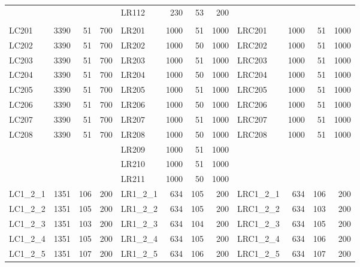 \documentclass{anpet}
\begin{document}
\begin{table}[H]
\begin{tabular}{lrrr|lrrr|lrrr}
                   &      &     &     & LR112      &  230 &  53 &  200 &             &      &     &     \\
                   &      &     &     &            &      &     &      &             &      &     &     \\
        LC201      & 3390 &  51 & 700 & LR201      & 1000 &  51 & 1000 & LRC201      & 1000 &  51 & 1000\\
        LC202      & 3390 &  51 & 700 & LR202      & 1000 &  50 & 1000 & LRC202      & 1000 &  51 & 1000\\
        LC203      & 3390 &  51 & 700 & LR203      & 1000 &  51 & 1000 & LRC203      & 1000 &  51 & 1000\\
        LC204      & 3390 &  51 & 700 & LR204      & 1000 &  50 & 1000 & LRC204      & 1000 &  51 & 1000\\
        LC205      & 3390 &  51 & 700 & LR205      & 1000 &  51 & 1000 & LRC205      & 1000 &  51 & 1000\\
        LC206      & 3390 &  51 & 700 & LR206      & 1000 &  50 & 1000 & LRC206      & 1000 &  51 & 1000\\
        LC207      & 3390 &  51 & 700 & LR207      & 1000 &  51 & 1000 & LRC207      & 1000 &  51 & 1000\\
        LC208      & 3390 &  51 & 700 & LR208      & 1000 &  50 & 1000 & LRC208      & 1000 &  51 & 1000\\
                   &      &     &     & LR209      & 1000 &  51 & 1000 &             &      &     &     \\
                   &      &     &     & LR210      & 1000 &  51 & 1000 &             &      &     &     \\
                   &      &     &     & LR211      & 1000 &  50 & 1000 &             &      &     &     \\
        \midrule
        LC1\_2\_1  & 1351 & 106 & 200 & LR1\_2\_1  &  634 & 105 &  200 & LRC1\_2\_1  &  634 & 106 &  200\\
        LC1\_2\_2  & 1351 & 105 & 200 & LR1\_2\_2  &  634 & 105 &  200 & LRC1\_2\_2  &  634 & 103 &  200\\
        LC1\_2\_3  & 1351 & 103 & 200 & LR1\_2\_3  &  634 & 104 &  200 & LRC1\_2\_3  &  634 & 105 &  200\\
        LC1\_2\_4  & 1351 & 105 & 200 & LR1\_2\_4  &  634 & 105 &  200 & LRC1\_2\_4  &  634 & 106 &  200\\
        LC1\_2\_5  & 1351 & 107 & 200 & LR1\_2\_5  &  634 & 106 &  200 & LRC1\_2\_5  &  634 & 107 &  200\\

\end{tabular}
\end{table}
\end{document}
